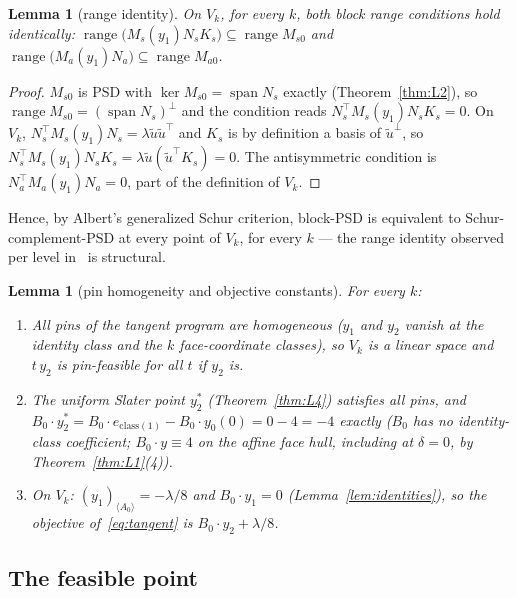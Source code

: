\documentclass[11pt]{article}
\newtheorem{lemma}[theorem]{Lemma}
\newcommand{\la}{\langle}
\newcommand{\ra}{\rangle}
\newcommand{\lam}{\lambda}
\DeclareMathOperator{\range}{range}
\DeclareMathOperator{\Span}{span}
\begin{document}
\begin{lemma}[range identity]\label{lem:range}
On $V_k$, for every $k$, both block range conditions hold identically:
$\range\bigl(M_s(y_1)N_sK_s\bigr)\subseteq\range M_{s0}$ and
$\range\bigl(M_a(y_1)N_a\bigr)\subseteq\range M_{a0}$.
\end{lemma}

\begin{proof}
$M_{s0}$ is PSD with $\ker M_{s0}=\Span N_s$ exactly
(Theorem~\ref{thm:L2}), so $\range M_{s0}=(\Span N_s)^\perp$ and the
condition reads $N_s^\top M_s(y_1)N_sK_s=0$. On $V_k$,
$N_s^\top M_s(y_1)N_s=\lam\tilde u\tilde u^\top$ and $K_s$ is by
definition a basis of $\tilde u^\perp$, so
$N_s^\top M_s(y_1)N_sK_s=\lam\tilde u(\tilde u^\top K_s)=0$. The
antisymmetric condition is $N_a^\top M_a(y_1)N_a=0$, part of the
definition of $V_k$.
\end{proof}

Hence, by Albert's generalized Schur criterion, block-PSD is equivalent to
Schur-complement-PSD at every point of $V_k$, for every $k$ --- the range
identity observed per level in~\cite{overshoot} is structural.

\begin{lemma}[pin homogeneity and objective constants]\label{lem:pins}
For every $k$:
\begin{enumerate}
\item All pins of the tangent program are homogeneous ($y_1$ and $y_2$
  vanish at the identity class and the $k$ face-coordinate classes), so
  $V_k$ is a linear space and $t\,y_2$ is pin-feasible for all $t$ if
  $y_2$ is.
\item The uniform Slater point $y_2^\ast$ (Theorem~\ref{thm:L4}) satisfies
  all pins, and $B_0\cdot y_2^\ast=B_0\cdot e_{\mathrm{class}(1)}
  -B_0\cdot y_0(0)=0-4=-4$ exactly ($B_0$ has no identity-class
  coefficient; $B_0\cdot y\equiv4$ on the affine face hull, including at
  $\delta=0$, by Theorem~\ref{thm:L1}(4)).
\item On $V_k$: $(y_1)_{\la A_0\ra}=-\lam/8$ and $B_0\cdot y_1=0$
  (Lemma~\ref{lem:identities}), so the objective of~\eqref{eq:tangent} is
  $B_0\cdot y_2+\lam/8$.
\end{enumerate}
\end{lemma}

\subsection{The feasible point}
\end{document}
